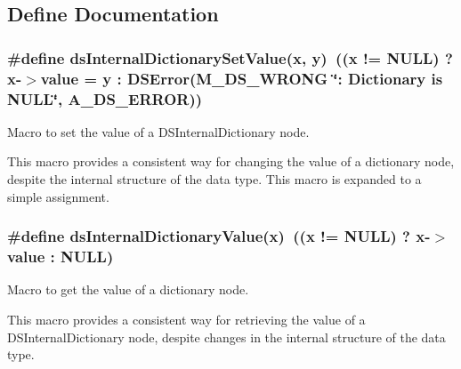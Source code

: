 \subsection{Define Documentation}
\hypertarget{group___d_s___d_i_c_t_i_o_n_a_r_y___a_c_c_e_s_s_o_r_y_gafb8150844a937da605ec4aa474c4ccaa}{
\subsubsection[{dsInternalDictionarySetValue}]{\setlength{\rightskip}{0pt plus 5cm}\#define dsInternalDictionarySetValue(x, \/  y)~((x != NULL) ? x-\/$>$value = y : DSError(M\_\-DS\_\-WRONG \char`\"{}: Dictionary is NULL\char`\"{}, A\_\-DS\_\-ERROR))}}
\label{group___d_s___d_i_c_t_i_o_n_a_r_y___a_c_c_e_s_s_o_r_y_gafb8150844a937da605ec4aa474c4ccaa}


Macro to set the value of a DSInternalDictionary node. 

This macro provides a consistent way for changing the value of a dictionary node, despite the internal structure of the data type. This macro is expanded to a simple assignment. \hypertarget{group___d_s___d_i_c_t_i_o_n_a_r_y___a_c_c_e_s_s_o_r_y_gab41d65e77a69ffe5fb577a042ab73cdc}{
\subsubsection[{dsInternalDictionaryValue}]{\setlength{\rightskip}{0pt plus 5cm}\#define dsInternalDictionaryValue(x)~((x != NULL) ? x-\/$>$value : NULL)}}
\label{group___d_s___d_i_c_t_i_o_n_a_r_y___a_c_c_e_s_s_o_r_y_gab41d65e77a69ffe5fb577a042ab73cdc}


Macro to get the value of a dictionary node. 

This macro provides a consistent way for retrieving the value of a DSInternalDictionary node, despite changes in the internal structure of the data type. 